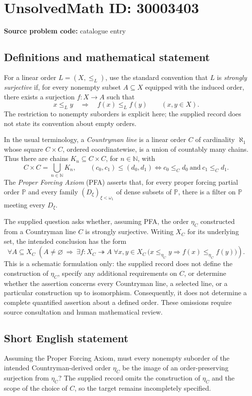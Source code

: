 \documentclass[11pt]{article}
\newcommand{\N}{\mathbb{N}}
\begin{document}
\section*{UnsolvedMath ID: 30003403}
\textbf{Source problem code:} catalogue entry
\subsection{Definitions and mathematical statement}
For a linear order \(L=(X,\leq_L)\), use the standard convention that \(L\) is \emph{strongly surjective} if, for every nonempty subset \(A\subseteq X\) equipped with the induced order, there exists a surjection \(f:X\to A\) such that
\[
 x\leq_L y\quad\Longrightarrow\quad f(x)\leq_L f(y)
 \qquad(x,y\in X).
\]
The restriction to nonempty suborders is explicit here; the supplied record does not state its convention about empty orders.

In the usual terminology, a \emph{Countryman line} is a linear order \(C\) of cardinality \(\aleph_1\) whose square \(C\times C\), ordered coordinatewise, is a union of countably many chains. Thus there are chains \(K_n\subseteq C\times C\), for \(n\in\N\), with
\[
 C\times C=\bigcup_{n\in\N}K_n,
 \qquad
 (c_0,c_1)\leq(d_0,d_1)
 \iff c_0\leq_C d_0\ \text{and}\ c_1\leq_C d_1.
\]
The \emph{Proper Forcing Axiom} (PFA) asserts that, for every proper forcing partial order \(\mathbb P\) and every family \((D_\xi)_{\xi<\omega_1}\) of dense subsets of \(\mathbb P\), there is a filter on \(\mathbb P\) meeting every \(D_\xi\).

The supplied question asks whether, assuming PFA, the order \(\eta_C\) constructed from a Countryman line \(C\) is strongly surjective. Writing \(X_C\) for its underlying set, the intended conclusion has the form
\[
 \forall A\subseteq X_C\;
 \left(A\ne\varnothing\ \Longrightarrow\
 \exists f:X_C\twoheadrightarrow A\;
 \forall x,y\in X_C\,
 \bigl(x\leq_{\eta_C}y\Longrightarrow
 f(x)\leq_{\eta_C}f(y)\bigr)\right).
\]
This is a schematic formulation only: the supplied record does not define the construction of \(\eta_C\), specify any additional requirements on \(C\), or determine whether the assertion concerns every Countryman line, a selected line, or a particular construction up to isomorphism. Consequently, it does not determine a complete quantified assertion about a defined order. These omissions require source consultation and human mathematical review.
\subsection{Short English statement}
Assuming the Proper Forcing Axiom, must every nonempty suborder of the intended Countryman-derived order \(\eta_C\) be the image of an order-preserving surjection from \(\eta_C\)? The supplied record omits the construction of \(\eta_C\) and the scope of the choice of \(C\), so the target remains incompletely specified.
\end{document}
